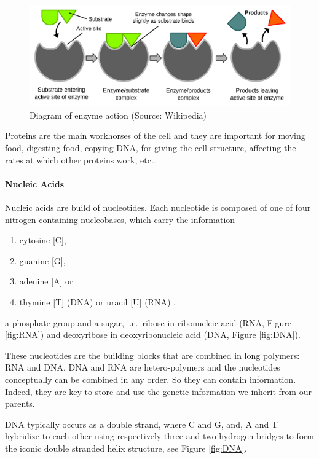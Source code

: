 \documentclass[
  11pt,
]{book}
\providecommand{\tightlist}{%
  \setlength{\itemsep}{0pt}\setlength{\parskip}{0pt}}
\begin{document}
\begin{figure}

{\centering \includegraphics[width=0.5\linewidth]{./figs/EnzymePadlockKey} 

}

\caption{Diagram of enzyme action (Source: Wikipedia)}\label{fig:enzyme}
\end{figure}

Proteins are the main workhorses of the cell and they are important for moving food, digesting food, copying DNA, for giving the cell structure, affecting the rates at which other proteins work, etc\ldots{}

\hypertarget{nucleic-acids}{%
\paragraph{Nucleic Acids}\label{nucleic-acids}}

Nucleic acids are build of nucleotides.
Each nucleotide is composed of one of four nitrogen-containing nucleobases, which carry the information

\begin{enumerate}
\def\labelenumi{\arabic{enumi}.}
\tightlist
\item
  cytosine {[}C{]},
\item
  guanine {[}G{]},
\item
  adenine {[}A{]} or
\item
  thymine {[}T{]} (DNA) or uracil {[}U{]} (RNA) ,
\end{enumerate}

a phosphate group and a sugar, i.e.~ribose in ribonucleic acid (RNA, Figure \ref{fig:RNA}) and deoxyribose in deoxyribonucleic acid (DNA, Figure \ref{fig:DNA}).

These nucleotides are the building blocks that are combined in long polymers: RNA and DNA.
DNA and RNA are hetero-polymers and the nucleotides conceptually can be combined in any order.
So they can contain information.
Indeed, they are key to store and use the genetic information we inherit from our parents.

DNA typically occurs as a double strand, where C and G, and, A and T hybridize to each other using respectively three and two hydrogen bridges to form the iconic double stranded helix structure, see Figure \ref{fig:DNA}.
\end{document}
